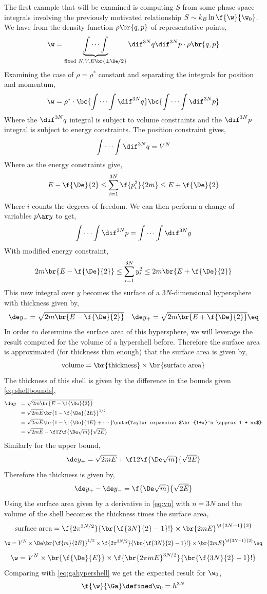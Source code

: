\documentclass{article}
\begin{document}
The first example that will be examined is computing $S$ from some phase space integrals involving the previously motivated relationship $S \sim k_B \ln \f{\w}{\w_0}$. We have from the density function $\rho\br{q,p}$ of representative points,
\[ \w = \underbrace{\int \cdots \int}_{\text{fixed } N,V,E \br{\pm \De / 2}} \dif^{3N} q \dif^{3N} p \cdot \rho\br{q,p} \]
Examining the case of $\rho = \rho^*$ constant and separating the integrals for position and momentum,
\[ \w = \rho^* \cdot \bc{\int \cdots \int \dif^{3N} q} \bc{\int \cdots \int \dif^{3N} p} \]
Where the $\dif^{3N} q$ integral is subject to volume constraints and the $\dif^{3N} p$ integral is subject to energy constraints. The position constraint gives,
\[ \int \cdots \int \dif^{3N} q = V^N \]
Where as the energy constraints give,
\[ E - \f{\De}{2} \leq \sum_{i=1}^{3N}\f{p_i^2}{2m} \leq E + \f{\De}{2} \]
Where $i$ counts the degrees of freedom. We can then perform a change of variables $p \ar y$ to get,
\[ \int \cdots \int \dif^{3N} p = \int \cdots \int \dif^{3N} y \]
With modified energy constraint,
\[ 2m\br{E - \f{\De}{2}} \leq \sum_{i=1}^{3N}y_i^2 \leq 2m\br{E + \f{\De}{2}} \]
This new integral over $y$ becomes the surface of a $3N$-dimensional hypersphere with thickness given by,
\[ \de y_- = \sqrt{2m\br{E - \f{\De}{2}}} \quad \de y_+ = \sqrt{2m\br{E + \f{\De}{2}}} \eq \label{eq:shellbounds} \]
In order to determine the surface area of this hypersphere, we will leverage the result computed for the volume of a hypershell before. Therefore the surface area is approximated (for thickness thin enough) that the surface area is given by,
\[ \text{volume} = \br{\text{thickness}} \times \br{\text{surface area}} \]
The thickness of this shell is given by the difference in the bounds given \eqref{eq:shellbounds},
\begin{align*}
\de y_- &= \sqrt{2m\br{E - \f{\De}{2}}} \\
&= \sqrt{2mE}\br{1 - \f{\De}{2E}}^{1/2} \\
&= \sqrt{2mE}\br{1 - \f{\De}{4E} + \cdots} \note{Taylor expansion $\br{1+x}^n \approx 1 + nx$} \\
&= \sqrt{2mE} - \f12 \f{\De\sqrt{m}}{\sqrt{2E}}
\end{align*}
Similarly for the upper bound,
\[ \de y_+ = \sqrt{2mE} + \f12 \f{\De\sqrt{m}}{\sqrt{2E}} \]
Therefore the thickness is given by,
\[ \de y_+ - \de y_- = \f{\De\sqrt{m}}{\sqrt{2E}} \]
Using the surface area given by a derivative in \eqref{eq:vn} with $n = 3N$ and the volume of the shell becomes the thickness times the surface area,
\[ \text{surface area} = \f{2\pi^{3N/2}}{\br{\f{3N}{2} - 1}!} \times \br{2mE}^{\f{3N - 1}{2}} \]
\[ \w = V^N \times \De \br{\f{m}{2E}}^{1/2} \times \f{2\pi^{3N/2}}{\br{\f{3N}{2} - 1}!} \times \br{2mE}^{\f{3N - 1}{2}} \eq \label{eq:omega} \]
\[ \w = V^N \times \br{\f{\De}{E}} \times \f{\br{2 \pi m E}^{3N/2}}{\br{\f{3N}{2} - 1}!} \]
Comparing with \eqref{eq:gahypershell} we get the expected result for $\w_0$,
\[ \f{\w}{\Ga} \defined \w_0 = h^{3N} \]
\end{document}
